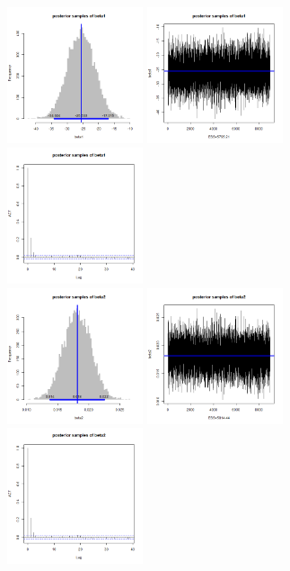 \documentclass{article}
\begin{document}
\begin{figure}[!h]
    \centering
    \includegraphics[width=4cm]{beta1_hist.png}
    \includegraphics[width=4cm]{beta1_traceplot.png}
    \includegraphics[width=4cm]{beta1_acf.png} \\
    \includegraphics[width=4cm]{beta2_hist.png}
    \includegraphics[width=4cm]{beta2_traceplot.png}
    \includegraphics[width=4cm]{beta2_acf.png} \\

\end{figure}
\end{document}
